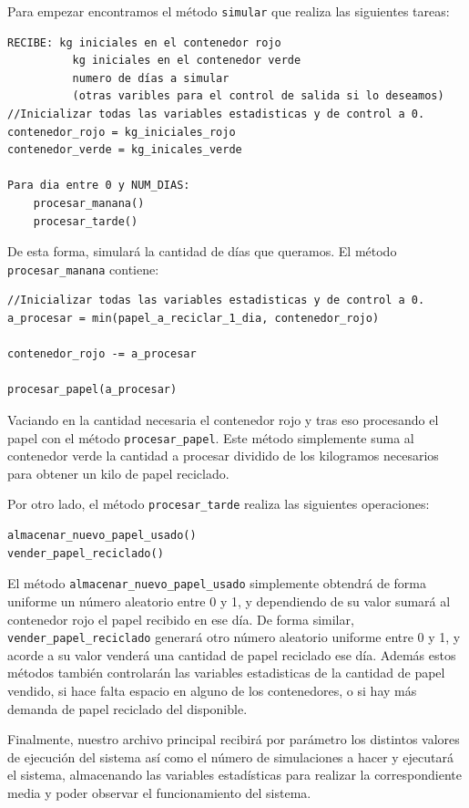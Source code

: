 \documentclass[12pt, spanish]{article}
\begin{document}
Para empezar encontramos el método \texttt{simular} que realiza las siguientes tareas:

\begin{lstlisting}
RECIBE: kg iniciales en el contenedor rojo
		  kg iniciales en el contenedor verde
		  numero de días a simular
		  (otras varibles para el control de salida si lo deseamos)
//Inicializar todas las variables estadisticas y de control a 0.
contenedor_rojo = kg_iniciales_rojo
contenedor_verde = kg_inicales_verde

Para dia entre 0 y NUM_DIAS:
	procesar_manana()
	procesar_tarde()
\end{lstlisting}


De esta forma, simulará la cantidad de días que queramos. El método \texttt{procesar\_manana} contiene:

\begin{lstlisting}
//Inicializar todas las variables estadisticas y de control a 0.
a_procesar = min(papel_a_reciclar_1_dia, contenedor_rojo)

contenedor_rojo -= a_procesar

procesar_papel(a_procesar)
\end{lstlisting}

Vaciando en la cantidad necesaria el contenedor rojo y tras eso procesando el papel con el método \texttt{procesar\_papel}. Este método simplemente suma al contenedor verde la cantidad a procesar dividido de los kilogramos necesarios para obtener un kilo de papel reciclado.


Por otro lado, el método \texttt{procesar\_tarde} realiza las siguientes operaciones:

\begin{lstlisting}
almacenar_nuevo_papel_usado()
vender_papel_reciclado()
\end{lstlisting}

El método \texttt{almacenar\_nuevo\_papel\_usado} simplemente obtendrá de forma uniforme un número aleatorio entre 0 y 1, y dependiendo de su valor sumará al contenedor rojo el papel recibido en ese día. De forma similar, \texttt{vender\_papel\_reciclado} generará otro número aleatorio uniforme entre 0 y 1, y acorde a su valor venderá una cantidad de papel reciclado ese día. Además estos métodos también controlarán las variables estadisticas de la cantidad de papel vendido, si hace falta espacio en alguno de los contenedores, o si hay más demanda de papel reciclado del disponible.


Finalmente, nuestro archivo principal recibirá por parámetro los distintos valores de ejecución del sistema así como el número de simulaciones a hacer y ejecutará el sistema, almacenando las variables estadísticas para realizar la correspondiente media y poder observar el funcionamiento del sistema.
\end{document}
